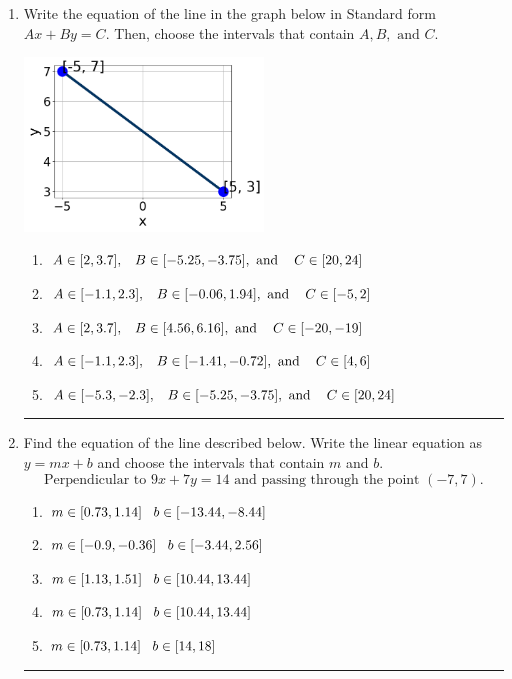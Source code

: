 \documentclass[14pt]{extbook}
\newcommand{\litem}[1]{\item#1\hspace*{-1cm}\rule{\textwidth}{0.4pt}}
\begin{document}
\begin{enumerate}
{\begin{enumerate}[label=\Alph*.]
\end{enumerate} }
\litem{
Write the equation of the line in the graph below in Standard form $Ax+By=C$. Then, choose the intervals that contain $A, B, \text{ and } C$.
\begin{center}
    \includegraphics[width=0.5\textwidth]{../Figures/linearGraphToStandardCopyC.png}
\end{center}
\begin{enumerate}[label=\Alph*.]
\item \( A \in [2, 3.7], \hspace{3mm} B \in [-5.25, -3.75], \text{ and } \hspace{3mm} C \in [20, 24] \)
\item \( A \in [-1.1, 2.3], \hspace{3mm} B \in [-0.06, 1.94], \text{ and } \hspace{3mm} C \in [-5, 2] \)
\item \( A \in [2, 3.7], \hspace{3mm} B \in [4.56, 6.16], \text{ and } \hspace{3mm} C \in [-20, -19] \)
\item \( A \in [-1.1, 2.3], \hspace{3mm} B \in [-1.41, -0.72], \text{ and } \hspace{3mm} C \in [4, 6] \)
\item \( A \in [-5.3, -2.3], \hspace{3mm} B \in [-5.25, -3.75], \text{ and } \hspace{3mm} C \in [20, 24] \)

\end{enumerate} }
\litem{
Find the equation of the line described below. Write the linear equation as $ y=mx+b $ and choose the intervals that contain $m$ and $b$.\[ \text{Perpendicular to } 9 x + 7 y = 14 \text{ and passing through the point } (-7, 7). \]\begin{enumerate}[label=\Alph*.]
\item \( m \in [0.73, 1.14] \hspace*{3mm} b \in [-13.44, -8.44] \)
\item \( m \in [-0.9, -0.36] \hspace*{3mm} b \in [-3.44, 2.56] \)
\item \( m \in [1.13, 1.51] \hspace*{3mm} b \in [10.44, 13.44] \)
\item \( m \in [0.73, 1.14] \hspace*{3mm} b \in [10.44, 13.44] \)
\item \( m \in [0.73, 1.14] \hspace*{3mm} b \in [14, 18] \)


\end{enumerate}}
\end{enumerate}
\end{document}
